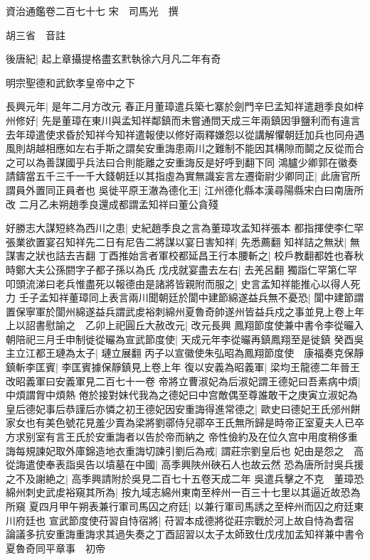 資治通鑑卷二百七十七
宋　司馬光　撰

胡三省　音註

後唐紀|{
	起上章攝提格盡玄黓執徐六月凡二年有奇}


明宗聖德和武欽孝皇帝中之下

長興元年|{
	是年二月方改元}
春正月董璋遣兵築七寨於劍門辛巳孟知祥遣趙季良如梓州修好|{
	先是董璋在東川與孟知祥鄰鎮而未嘗通問天成三年兩鎮因爭鹽利而有違言去年璋遣使求昏於知祥今知祥遣報使以修好兩釋嫌怨以從講解懼朝廷加兵也同舟遇風則胡越相應如左右手斯之謂矣安重誨患兩川之難制不能因其構隙而鬬之反從而合之可以為善謀國乎兵法曰合則能離之安重誨反是好呼到翻下同}
鴻臚少卿郭在徽奏請鑄當五千三千一千大錢朝廷以其指虛為實無識妄言左遷衛尉少卿同正|{
	此唐官所謂員外置同正員者也}
吳徙平原王澈為德化王|{
	江州德化縣本漢尋陽縣宋白曰南唐所改}
二月乙未朔趙季良還成都謂孟知祥曰董公貪殘

好勝志大謀短終為西川之患|{
	史紀趙季良之言為董璋攻孟知祥張本}
都指揮使李仁罕張業欲置宴召知祥先二日有尼告二將謀以宴日害知祥|{
	先悉薦翻}
知祥詰之無狀|{
	無謀害之狀也詰去吉翻}
丁酉推始言者軍校都延昌王行本腰斬之|{
	校戶教翻都姓也春秋時鄭大夫公孫閼字子都子孫以為氏}
戊戌就宴盡去左右|{
	去羌呂翻}
獨詣仁罕第仁罕叩頭流涕曰老兵惟盡死以報德由是諸將皆親附而服之|{
	史言孟知祥能推心以得人死力}
壬子孟知祥董璋同上表言兩川聞朝廷於閬中建節綿遂益兵無不憂恐|{
	閬中建節謂置保寧軍於閬州綿遂益兵謂武䖍裕刺綿州夏魯奇帥遂州皆益兵戍之事並見上卷上年}
上以詔書慰諭之　乙卯上祀圓丘大赦改元|{
	改元長興}
鳳翔節度使兼中書令李從曮入朝陪祀三月壬申制徙從曮為宣武節度使|{
	天成元年李從曮再鎮鳳翔至是徙鎮}
癸酉吳主立江都王璉為太子|{
	璉立展翻}
丙子以宣徽使朱弘昭為鳳翔節度使　康福奏克保靜鎮斬李匡賓|{
	李匡賓據保靜鎮見上卷上年}
復以安義為昭義軍|{
	梁均王龍德二年晉王改昭義軍曰安義軍見二百七十一卷}
帝將立曹淑妃為后淑妃謂王德妃曰吾素病中煩|{
	中煩謂胷中煩熱}
倦於接對妹代我為之德妃曰中宫敵偶至尊誰敢干之庚寅立淑妃為皇后德妃事后恭謹后亦憐之初王德妃因安重誨得進常德之|{
	歐史曰德妃王氏邠州餅家女也有美色號花見羞少賣為梁將劉鄩侍兒鄩卒王氏無所歸是時帝正室夏夫人已卒方求别室有言王氏於安重誨者以告於帝而納之}
帝性儉約及在位久宫中用度稍侈重誨每規諫妃取外庫錦造地衣重誨切諫引劉后為戒|{
	謂莊宗劉皇后也}
妃由是怨之　高從誨遣使奉表詣吳告以墳墓在中國|{
	高季興陜州硤石人也故云然}
恐為唐所討吳兵援之不及謝絶之|{
	高季興請附於吳見二百七十五卷天成二年}
吳遣兵擊之不克　董璋恐綿州刺史武䖍裕窺其所為|{
	按九域志綿州東南至梓州一百三十七里以其逼近故恐為所窺}
夏四月甲午朔表兼行軍司馬囚之府廷|{
	以兼行軍司馬誘之至梓州而囚之府廷東川府廷也}
宣武節度使苻習自恃宿將|{
	苻習本成德將從莊宗戰於河上故自恃為耆宿}
論議多抗安重誨重誨求其過失奏之丁酉詔習以太子太師致仕戊戌加孟知祥兼中書令夏魯奇同平章事　初帝

